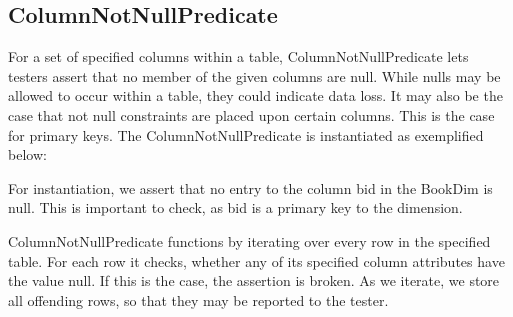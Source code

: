 \subsection{ColumnNotNullPredicate}
For a set of specified columns within a table, ColumnNotNullPredicate lets testers assert that no member of the given columns are null. While nulls may be allowed to occur within a table, they could indicate data loss. It may also be the case that not null constraints are placed upon certain columns. This is the case for primary keys. The ColumnNotNullPredicate is instantiated as exemplified below:


For instantiation, we assert that no entry to the column bid in the BookDim is null. This is important to check, as bid is a primary key to the dimension. 

ColumnNotNullPredicate functions by iterating over every row in the specified table. For each row it checks, whether any of its specified column attributes have the value null. If this is the case, the assertion is broken. As we iterate, we store all offending rows, so that they may be reported to the tester. 


